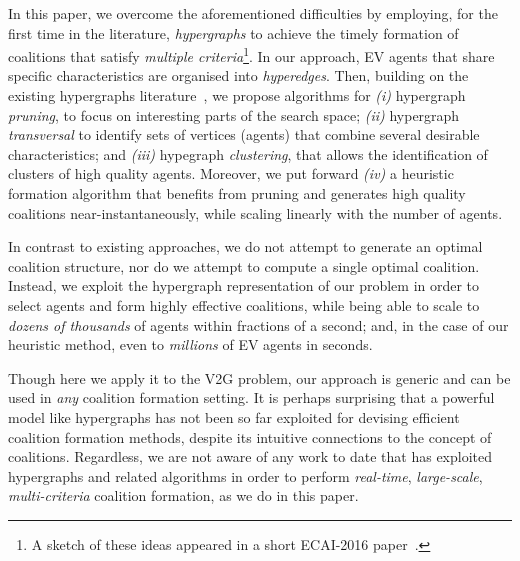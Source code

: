 In this paper, we overcome the aforementioned difficulties by employing, for the first time in the literature, {\em hypergraphs} to achieve the timely formation of coalitions that satisfy {\em multiple criteria}\footnote{A sketch of these ideas appeared in a short ECAI-2016 paper~\cite{christianos2016}.}. In our approach, EV agents that share specific characteristics are organised into {\em hyperedges}. Then, building on the existing hypergraphs 
literature~\cite{eiter1995identifying,zhou2006learning}, we propose algorithms for {\em (i)} hypergraph {\em pruning},  to focus on interesting parts of the search space; 
{\em (ii)}  hypergraph {\em transversal} to identify sets of vertices (agents) that combine several desirable characteristics; and {\em (iii)} hypegraph {\em clustering}, that allows the identification of clusters of high quality agents. Moreover, we put forward {\em (iv)}  a heuristic formation algorithm that benefits from pruning and generates high quality coalitions near-instantaneously, while scaling linearly with the number of agents.

In contrast to existing approaches, we do not attempt to generate an optimal coalition structure, nor do we attempt to compute a single optimal coalition.
Instead, we exploit the hypergraph representation of our problem in order to select agents and form highly effective coalitions, while being able to scale to {\em dozens of thousands} of agents within fractions of a second; and, in the case of our heuristic method, even to {\em millions} of EV agents in seconds.

Though here we apply it to the V2G problem, our approach is generic and can be used in {\em any} coalition formation setting.
It is perhaps surprising that a powerful model like hypergraphs has not been so far exploited for devising efficient coalition formation methods, despite its intuitive connections to the concept of coalitions. Regardless, we are not aware of any work to date that has exploited hypergraphs and related algorithms in order to perform {\em real-time}, {\em large-scale}, {\em multi-criteria} coalition formation, as we do in this paper.



